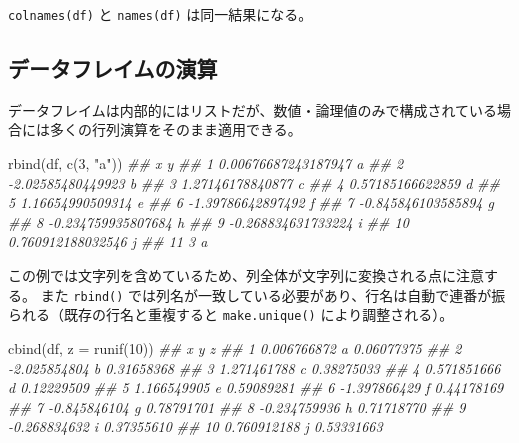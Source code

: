 \documentclass[
  letterpaper,
  xelatex,
  ja=standard, xelatex]{bxjsbook}
\newenvironment{Shaded}{\begin{snugshade}}{\end{snugshade}}
\newcommand{\AttributeTok}[1]{\textcolor[rgb]{0.40,0.45,0.13}{#1}}
\newcommand{\DecValTok}[1]{\textcolor[rgb]{0.68,0.00,0.00}{#1}}
\newcommand{\DocumentationTok}[1]{\textcolor[rgb]{0.37,0.37,0.37}{\textit{#1}}}
\newcommand{\FunctionTok}[1]{\textcolor[rgb]{0.28,0.35,0.67}{#1}}
\newcommand{\NormalTok}[1]{\textcolor[rgb]{0.00,0.23,0.31}{#1}}
\newcommand{\StringTok}[1]{\textcolor[rgb]{0.13,0.47,0.30}{#1}}
\begin{document}
\texttt{colnames(df)} と \texttt{names(df)} は同一結果になる。

\subsection{データフレイムの演算}\label{ux30c7ux30fcux30bfux30d5ux30ecux30a4ux30e0ux306eux6f14ux7b97}

データフレイムは内部的にはリストだが、数値・論理値のみで構成されている場合には多くの行列演算をそのまま適用できる。

\begin{Shaded}
\begin{Highlighting}[]
\FunctionTok{rbind}\NormalTok{(df, }\FunctionTok{c}\NormalTok{(}\DecValTok{3}\NormalTok{, }\StringTok{"a"}\NormalTok{))}
\DocumentationTok{\#\#                      x y}
\DocumentationTok{\#\# 1  0.00676687243187947 a}
\DocumentationTok{\#\# 2    {-}2.02585480449923 b}
\DocumentationTok{\#\# 3     1.27146178840877 c}
\DocumentationTok{\#\# 4     0.57185166622859 d}
\DocumentationTok{\#\# 5     1.16654990509314 e}
\DocumentationTok{\#\# 6    {-}1.39786642897492 f}
\DocumentationTok{\#\# 7   {-}0.845846103585894 g}
\DocumentationTok{\#\# 8   {-}0.234759935807684 h}
\DocumentationTok{\#\# 9   {-}0.268834631733224 i}
\DocumentationTok{\#\# 10   0.760912188032546 j}
\DocumentationTok{\#\# 11                   3 a}
\end{Highlighting}
\end{Shaded}

この例では文字列を含めているため、列全体が文字列に変換される点に注意する。
また \texttt{rbind()}
では列名が一致している必要があり、行名は自動で連番が振られる（既存の行名と重複すると
\texttt{make.unique()} により調整される）。

\begin{Shaded}
\begin{Highlighting}[]
\FunctionTok{cbind}\NormalTok{(df, }\AttributeTok{z =} \FunctionTok{runif}\NormalTok{(}\DecValTok{10}\NormalTok{))}
\DocumentationTok{\#\#               x y          z}
\DocumentationTok{\#\# 1   0.006766872 a 0.06077375}
\DocumentationTok{\#\# 2  {-}2.025854804 b 0.31658368}
\DocumentationTok{\#\# 3   1.271461788 c 0.38275033}
\DocumentationTok{\#\# 4   0.571851666 d 0.12229509}
\DocumentationTok{\#\# 5   1.166549905 e 0.59089281}
\DocumentationTok{\#\# 6  {-}1.397866429 f 0.44178169}
\DocumentationTok{\#\# 7  {-}0.845846104 g 0.78791701}
\DocumentationTok{\#\# 8  {-}0.234759936 h 0.71718770}
\DocumentationTok{\#\# 9  {-}0.268834632 i 0.37355610}
\DocumentationTok{\#\# 10  0.760912188 j 0.53331663}
\end{Highlighting}
\end{Shaded}
\end{document}
